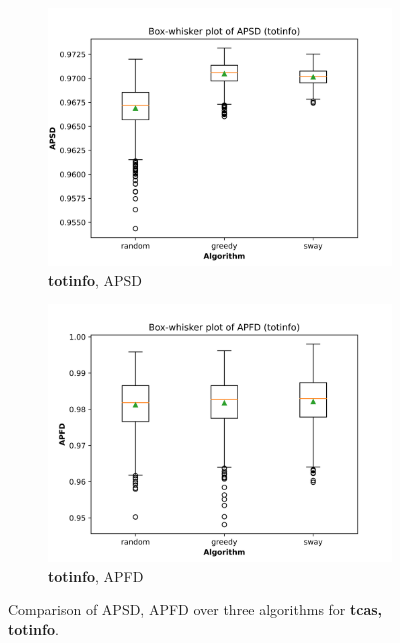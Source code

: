 \documentclass[10pt,journal,compsoc]{IEEEtran}
\begin{document}
\begin{figure}
		\begin{subfigure}[b]{0.4\linewidth}
			\centering
			\includegraphics[width=\textwidth]{figures/APSD_totinfo.png}
			\caption{{\bf totinfo}, APSD}
		\end{subfigure}
		\hfill
		\begin{subfigure}[b]{0.4\linewidth}
			\centering
			\includegraphics[width=\textwidth]{figures/APFD_totinfo.png}
			\caption{{\bf totinfo}, APFD}
		\end{subfigure}
		
		\caption{Comparison of APSD, APFD over three algorithms for {\bf tcas, totinfo}.}
		\label{fig:main3}
	\end{figure}
	
\end{document}
